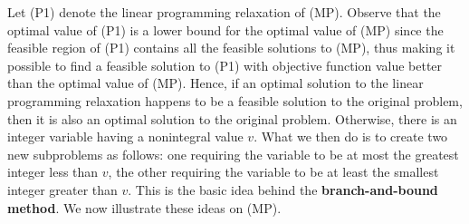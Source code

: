 Let (P1) denote the linear programming relaxation of (MP). Observe that
the optimal value of (P1) is a lower bound for the optimal value of (MP)
since the feasible region of (P1) contains all the feasible solutions to
(MP), thus making it possible to find a feasible solution to (P1) with
objective function value better than the optimal value of (MP). Hence,
if an optimal solution to the linear programming relaxation happens to
be a feasible solution to the original problem, then it is also an
optimal solution to the original problem. Otherwise, there is an integer
variable having a nonintegral value \(v\). What we then do is to create
two new subproblems as follows: one requiring the variable to be at most
the greatest integer less than \(v\), the other requiring the variable
to be at least the smallest integer greater than \(v\). This is the
basic idea behind the \textbf{branch-and-bound method}. We now
illustrate these ideas on (MP).

